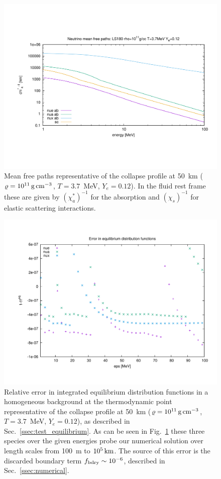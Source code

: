 \documentclass[aps,floatfix,prd,superscriptaddress,twocolumn]{revtex4-1}
\begin{document}
\begin{figure}
  \includegraphics[width=\columnwidth]{figure-mfps-50km}
  \caption{Mean free paths
    representative of the collapse profile at
    50~km ($\varrho=10^{11}\,{\rm g}\,{\rm cm}^{-3}$,
    $T=3.7$~MeV, $Y_e=0.12$).
    In the fluid rest frame these are given by
    $(\chi^*_a)^{-1}$ for the absorption
    and $(\chi_s)^{-1}$ for elastic scattering interactions.
  }
  \label{fig:mfps-50km}
\end{figure}

\begin{figure}
  \includegraphics[width=\columnwidth]{figure-ferr-50km}
  \caption{Relative error in integrated equilibrium distribution functions
    in a homogeneous background at the thermodynamic point
    representative of the collapse profile at
    50~km ($\varrho=10^{11}\,{\rm g}\,{\rm cm}^{-3}$,
    $T=3.7$~MeV, $Y_e=0.12$),
    as described in Sec.~\ref{ssec:test_equilibrium}.
    As can be seen in Fig.~\ref{fig:mfps-50km} these three species
    over the given energies
    probe our numerical solution over length scales from
    100~m to $10^{5}\,{\rm km}$.
    The source of this error is the discarded boundary term
    $f_{\rm bdry}\sim10^{-6}$, described in Sec.~\ref{ssec:numerical}.
  }
  \label{fig:homogeneous_isotropic}
\end{figure}
\end{document}
